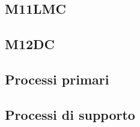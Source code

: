 {{{{{{{{{{{{\subsection{M11LMC}
\subsection{M12DC}






\subsection{Processi primari}
    
   
\subsection{Processi di supporto}
\begin{comment}
    {\renewcommand{\arraystretch}{1.5}
    \begin{tabularx}{\textwidth}{p{0.05\textwidth}|p{0.35\textwidth}|X|X}
    \textbf{ID} & \textbf{Nome metrica} & \textbf{Valore accettabile} & \textbf{Valore ottimale}  \\
    \hline
    \multicolumn{4}{l}{\cellcolor{primarycolor}\textbf{\textit{Verifica}}} \\
    \hline
     &  &  &  \\
    \hline
     &  &  &  \\
    \hline
     &  &  &  \\
    \hline
     &  &  &  \\
    \hline
    \multicolumn{4}{l}{\cellcolor{primarycolor}\textbf{\textit{Gestione della qualità}}} \\
    \hline
     &  &  &  \\
    \end{tabularx}}  
  
\subsubsection{Documentazione}
    {\renewcommand{\arraystretch}{1.5}
    \begin{tabularx}{\textwidth}{p{0.15\textwidth}|p{0.35\textwidth}|X|X}
    \textbf{ID} & \textbf{Nome metrica} & \textbf{Valore accettabile} & \textbf{Valore ottimale}  \\
    \hline
    \multicolumn{4}{l}{\cellcolor{primarycolor}\textbf{\textit{Funzionalità}}} \\
    \hline
    MPD-CR & Copertura dei requisiti & 100 & 100 \\
    

\end{comment}}}}}}}}}}}}}
